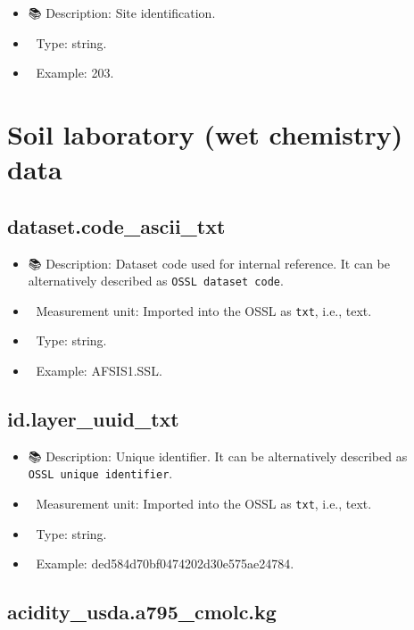 \documentclass[
  letterpaper,
  DIV=11,
  numbers=noendperiod]{scrreprt}
\providecommand{\tightlist}{%
  \setlength{\itemsep}{0pt}\setlength{\parskip}{0pt}}\usepackage{longtable,booktabs,array}
\begin{document}
\begin{itemize}
\tightlist
\item
  📚 Description: Site identification.
\item
  🔢 Type: string.
\item
  📖 Example: 203.
\end{itemize}

\section{Soil laboratory (wet chemistry) data}\label{soillab-table}

\subsection{dataset.code\_ascii\_txt}\label{dataset.code_ascii_txt-1}

\begin{itemize}
\tightlist
\item
  📚 Description: Dataset code used for internal reference. It can be
  alternatively described as \texttt{OSSL\ dataset\ code}.
\item
  📐 Measurement unit: Imported into the OSSL as \texttt{txt}, i.e.,
  text.
\item
  🔢 Type: string.
\item
  📖 Example: AFSIS1.SSL.
\end{itemize}

\subsection{id.layer\_uuid\_txt}\label{id.layer_uuid_txt-1}

\begin{itemize}
\tightlist
\item
  📚 Description: Unique identifier. It can be alternatively described
  as \texttt{OSSL\ unique\ identifier}.
\item
  📐 Measurement unit: Imported into the OSSL as \texttt{txt}, i.e.,
  text.
\item
  🔢 Type: string.
\item
  📖 Example: ded584d70bf0474202d30e575ae24784.
\end{itemize}

\subsection{acidity\_usda.a795\_cmolc.kg}\label{acidity_usda.a795_cmolc.kg}
\end{document}
